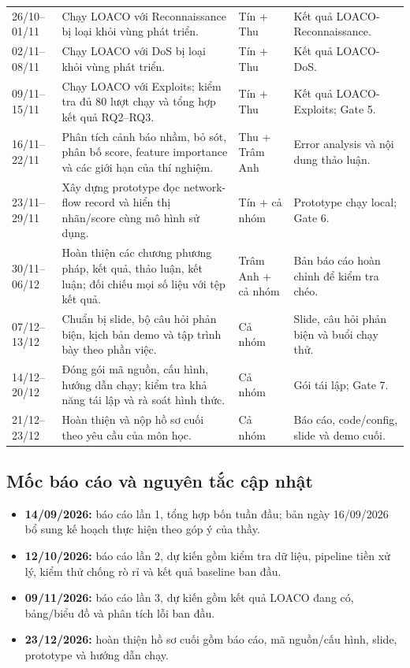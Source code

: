 \documentclass[12pt,a4paper,oneside]{article}
\begin{document}
\begin{longtable}{L{2.45cm}L{5.65cm}L{2.75cm}L{4.25cm}}
26/10--01/11 & Chạy LOACO với Reconnaissance bị loại khỏi vùng phát triển. & Tín + Thu & Kết quả LOACO-Reconnaissance.\\
02/11--08/11 & Chạy LOACO với DoS bị loại khỏi vùng phát triển. & Tín + Thu & Kết quả LOACO-DoS.\\
09/11--15/11 & Chạy LOACO với Exploits; kiểm tra đủ 80 lượt chạy và tổng hợp kết quả RQ2--RQ3. & Tín + Thu & Kết quả LOACO-Exploits; Gate 5.\\
16/11--22/11 & Phân tích cảnh báo nhầm, bỏ sót, phân bố score, feature importance và các giới hạn của thí nghiệm. & Thu + Trâm Anh & Error analysis và nội dung thảo luận.\\
23/11--29/11 & Xây dựng prototype đọc network-flow record và hiển thị nhãn/score cùng mô hình sử dụng. & Tín + cả nhóm & Prototype chạy local; Gate 6.\\
30/11--06/12 & Hoàn thiện các chương phương pháp, kết quả, thảo luận, kết luận; đối chiếu mọi số liệu với tệp kết quả. & Trâm Anh + cả nhóm & Bản báo cáo hoàn chỉnh để kiểm tra chéo.\\
07/12--13/12 & Chuẩn bị slide, bộ câu hỏi phản biện, kịch bản demo và tập trình bày theo phần việc. & Cả nhóm & Slide, câu hỏi phản biện và buổi chạy thử.\\
14/12--20/12 & Đóng gói mã nguồn, cấu hình, hướng dẫn chạy; kiểm tra khả năng tái lập và rà soát hình thức. & Cả nhóm & Gói tái lập; Gate 7.\\
21/12--23/12 & Hoàn thiện và nộp hồ sơ cuối theo yêu cầu của môn học. & Cả nhóm & Báo cáo, code/config, slide và demo cuối.\\
\end{longtable}
\normalsize

\subsection{Mốc báo cáo và nguyên tắc cập nhật}
\begin{itemize}[leftmargin=1.05cm,itemsep=0.25em]
\item \textbf{14/09/2026:} báo cáo lần 1, tổng hợp bốn tuần đầu; bản ngày 16/09/2026 bổ sung kế hoạch thực hiện theo góp ý của thầy.
\item \textbf{12/10/2026:} báo cáo lần 2, dự kiến gồm kiểm tra dữ liệu, pipeline tiền xử lý, kiểm thử chống rò rỉ và kết quả baseline ban đầu.
\item \textbf{09/11/2026:} báo cáo lần 3, dự kiến gồm kết quả LOACO đang có, bảng/biểu đồ và phân tích lỗi ban đầu.
\item \textbf{23/12/2026:} hoàn thiện hồ sơ cuối gồm báo cáo, mã nguồn/cấu hình, slide, prototype và hướng dẫn chạy.
\end{itemize}
\end{document}

